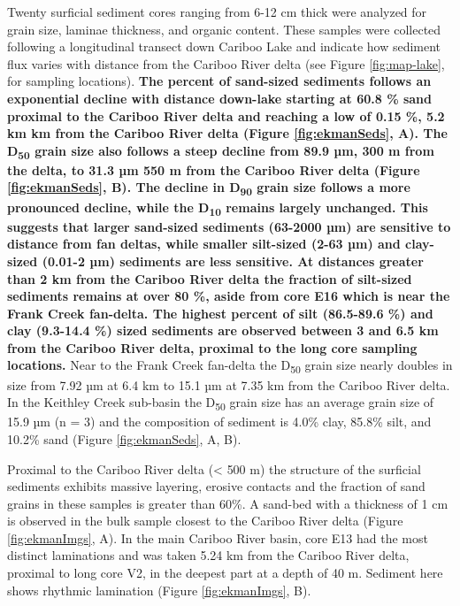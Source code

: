 \documentclass[Royal,times,doublespace,sageh]{sagej}
\begin{document}
Twenty surficial sediment cores ranging from 6-12 cm thick were analyzed
for grain size, laminae thickness, and organic content. These samples
were collected following a longitudinal transect down Cariboo Lake and
indicate how sediment flux varies with distance from the Cariboo River
delta (see Figure \ref{fig:map-lake}, for sampling locations).
\textbf{The percent of sand-sized sediments follows an exponential
decline with distance down-lake starting at 60.8 \% sand proximal to the
Cariboo River delta and reaching a low of 0.15 \%, 5.2 km km from the
Cariboo River delta (Figure \ref{fig:ekmanSeds}, A). The
D\textsubscript{50} grain size also follows a steep decline from 89.9
µm, 300 m from the delta, to 31.3 µm 550 m from the Cariboo River delta
(Figure \ref{fig:ekmanSeds}, B). The decline in D\textsubscript{90}
grain size follows a more pronounced decline, while the
D\textsubscript{10} remains largely unchanged. This suggests that larger
sand-sized sediments (63-2000 µm) are sensitive to distance from fan
deltas, while smaller silt-sized (2-63 µm) and clay-sized (0.01-2 µm)
sediments are less sensitive. At distances greater than 2 km from the
Cariboo River delta the fraction of silt-sized sediments remains at over
80 \%, aside from core E16 which is near the Frank Creek fan-delta. The
highest percent of silt (86.5-89.6 \%) and clay (9.3-14.4 \%) sized
sediments are observed between 3 and 6.5 km from the Cariboo River
delta, proximal to the long core sampling locations.} Near to the Frank
Creek fan-delta the D\textsubscript{50} grain size nearly doubles in
size from 7.92 µm at 6.4 km to 15.1 µm at 7.35 km from the Cariboo River
delta. In the Keithley Creek sub-basin the D\textsubscript{50} grain
size has an average grain size of 15.9 µm (n = 3) and the composition of
sediment is 4.0\% clay, 85.8\% silt, and 10.2\% sand (Figure
\ref{fig:ekmanSeds}, A, B).

Proximal to the Cariboo River delta (\textless{} 500 m) the structure of
the surficial sediments exhibits massive layering, erosive contacts and
the fraction of sand grains in these samples is greater than 60\%. A
sand-bed with a thickness of 1 cm is observed in the bulk sample closest
to the Cariboo River delta (Figure \ref{fig:ekmanImgs}, A). In the main
Cariboo River basin, core E13 had the most distinct laminations and was
taken 5.24 km from the Cariboo River delta, proximal to long core V2, in
the deepest part at a depth of 40 m. Sediment here shows rhythmic
lamination (Figure \ref{fig:ekmanImgs}, B).
\end{document}
